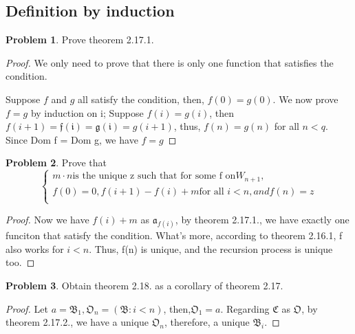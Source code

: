 \documentclass[a4paper,11pt]{article}%
\theoremstyle{remark}
\theoremstyle{definition}
\newtheorem{problem}{Problem}[subsection]
\begin{document}
\subsection{Definition by induction}
\begin{problem}
    Prove theorem 2.17.1.
    \begin{proof}
        We only need to prove that there is only one function that 
        satisfies the condition.

        Suppose $f$ and $g$ all satisfy the condition, then, 
        $f(0)=g(0)$. We now prove $f=g$ by induction on i;
        Suppose $f(i)=g(i)$, then $f(i+1)=\mathfrak{f(i)}=\mathfrak{g(i)}=g(i+1)$,
        thus, $f(n)=g(n)$ for all $n<q$. Since Dom f = Dom g, we have $f=g$
    \end{proof}
\end{problem}
\begin{problem}
    Prove that 
    \[\begin{cases}
        m\cdot n \text{is the unique z such that for some f on} W_{n+1},\\
        f(0)=0,f(i+1)-f(i)+m \text{for all } i<n, and f(n)=z\\
    \end{cases}\]
    \begin{proof}
       Now we have $f(i)+m$ as $\mathfrak{a}_{f(i)}$, by theorem 2.17.1., we have
       exactly one funciton that satisfy the condition. What's more, according to theorem 2.16.1,
       f also works for $i<n$. Thus, f(n) is unique, and the recursion process is unique too.
    \end{proof}
\end{problem}
\begin{problem}
    Obtain theorem 2.18. as a corollary of theorem 2.17.
    \begin{proof}
       Let $a=\mathfrak{B}_1,\mathfrak{O}_n=(\mathfrak{B}:i<n)$, then,$\mathfrak{O}_1=a$.
       Regarding $\mathfrak{C}$ as $\mathfrak{O}$, by theorem 2.17.2., we have a unique $\mathfrak{O}_n$,
       therefore, a unique $\mathfrak{B}_i$. 
    \end{proof}
\end{problem}
\end{document}

